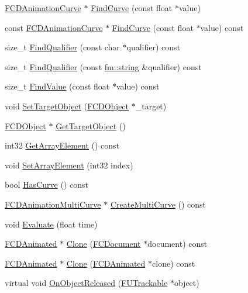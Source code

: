 \begin{DoxyCompactItemize}
\item 
\hyperlink{classFCDAnimationCurve}{FCDAnimationCurve} $\ast$ \hyperlink{classFCDAnimated_a3b6f378a1057bff112715a70efcbc195}{FindCurve} (const float $\ast$value)
\item 
const \hyperlink{classFCDAnimationCurve}{FCDAnimationCurve} $\ast$ \hyperlink{classFCDAnimated_a010defa487b611547292e75e955e99d5}{FindCurve} (const float $\ast$value) const 
\item 
size\_\-t \hyperlink{classFCDAnimated_abc95fade652f7cb561363a2f572a6783}{FindQualifier} (const char $\ast$qualifier) const 
\item 
size\_\-t \hyperlink{classFCDAnimated_ab021f4938ac47274ed7beb906644ae96}{FindQualifier} (const \hyperlink{classfm_1_1stringT}{fm::string} \&qualifier) const 
\item 
size\_\-t \hyperlink{classFCDAnimated_a596cb5706f21ec11a38a21cd08d0b593}{FindValue} (const float $\ast$value) const 
\item 
void \hyperlink{classFCDAnimated_aa184ab9d719e1e798f099ff820041d9a}{SetTargetObject} (\hyperlink{classFCDObject}{FCDObject} $\ast$\_\-target)
\item 
\hyperlink{classFCDObject}{FCDObject} $\ast$ \hyperlink{classFCDAnimated_a9b3fae0cc1f766c2312c955e83ed7d1d}{GetTargetObject} ()
\item 
int32 \hyperlink{classFCDAnimated_a3e5c36661a7ebbceeeece5a6a5ef24a8}{GetArrayElement} () const 
\item 
void \hyperlink{classFCDAnimated_a8c9c8b720246764d0e5d5c88a55c31ff}{SetArrayElement} (int32 index)
\item 
bool \hyperlink{classFCDAnimated_a2e475c6ce1890734b8b9bc5226b79b6a}{HasCurve} () const 
\item 
\hyperlink{classFCDAnimationMultiCurve}{FCDAnimationMultiCurve} $\ast$ \hyperlink{classFCDAnimated_a04a1a0a8b83d4718c3be05761d724e11}{CreateMultiCurve} () const 
\item 
void \hyperlink{classFCDAnimated_a1bd0b6deb59cc5343aba007c9f5eae0c}{Evaluate} (float time)
\item 
\hyperlink{classFCDAnimated}{FCDAnimated} $\ast$ \hyperlink{classFCDAnimated_a94bbb32ae705dacebe1223ba15f3356e}{Clone} (\hyperlink{classFCDocument}{FCDocument} $\ast$document) const 
\item 
\hyperlink{classFCDAnimated}{FCDAnimated} $\ast$ \hyperlink{classFCDAnimated_a0c88b1e9ac37d6bd67abc13fee817bc7}{Clone} (\hyperlink{classFCDAnimated}{FCDAnimated} $\ast$clone) const 
\item 
virtual void \hyperlink{classFCDAnimated_af56690d3ce4fcec0caceff540129ba97}{OnObjectReleased} (\hyperlink{classFUTrackable}{FUTrackable} $\ast$object)
\end{DoxyCompactItemize}
